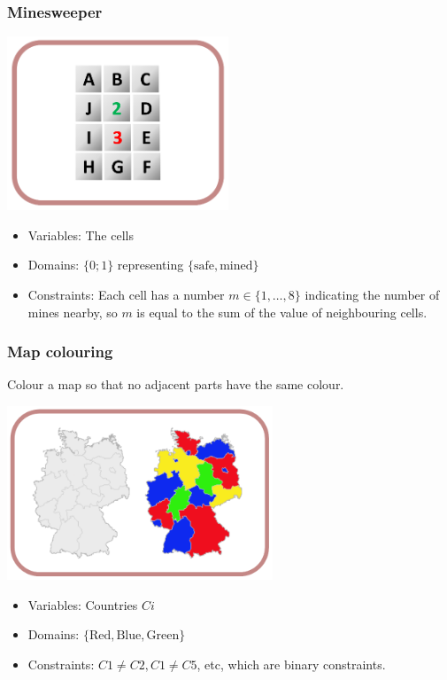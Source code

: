 \documentclass[11pt]{article}
\begin{document}
\subsubsection{Minesweeper}
\label{sec:org3e749d6}
\begin{center}
\includegraphics[height=14em]{./images/minesweeper-image.png}
\end{center}
\begin{itemize}
\item Variables: The cells
\item Domains: \(\{0; 1\}\) representing \(\{\text{safe}, \text{mined}\}\)
\item Constraints: Each cell has a number \(m \in \{1, \ldots, 8\}\) indicating the number of mines nearby, so \(m\) is equal to the sum of the value of neighbouring cells.
\end{itemize}
\subsubsection{Map colouring}
\label{sec:orgc07910b}
Colour a map so that no adjacent parts have the same colour.
\begin{center}
\includegraphics[height=14em]{./images/map-colouring-image.png}
\end{center}
\begin{itemize}
\item Variables: Countries \(Ci\)
\item Domains: \(\{\text{Red}, \text{Blue}, \text{Green}\}\)
\item Constraints: \(C1 \ne C2, C1 \ne C5\), etc, which are binary constraints.
\end{itemize}
\end{document}
